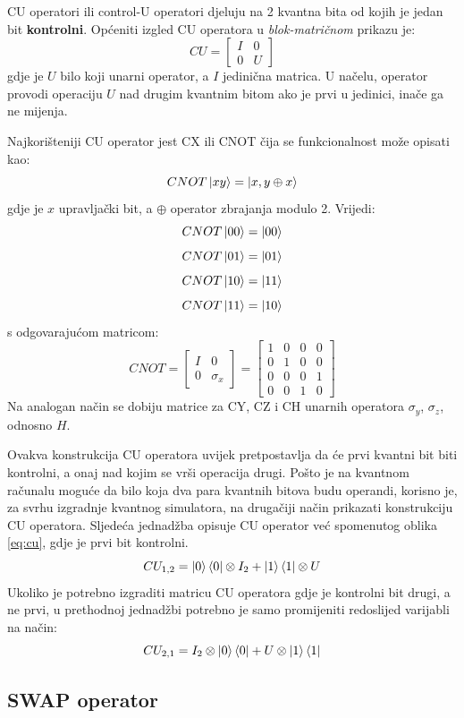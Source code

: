 CU operatori ili control-U operatori djeluju na 2 kvantna bita od kojih je jedan bit \textbf{kontrolni}. Općeniti izgled CU operatora u \emph{blok-matričnom} prikazu je:
\begin{equation}
CU = \begin{bmatrix}
I & 0 \\ 0 & U
\end{bmatrix}
\label{eq:cu}
\end{equation}
gdje je $U$ bilo koji unarni operator, a $I$ jedinična matrica. U načelu, operator provodi operaciju $U$ nad drugim kvantnim bitom ako je prvi u jedinici, inače ga ne mijenja.

Najkorišteniji CU operator jest CX ili CNOT čija se funkcionalnost može opisati kao:
\[
CNOT\ket{xy} = \ket{x, y\oplus x}
\]
gdje je $x$ upravljački bit, a $\oplus$ operator zbrajanja modulo 2. Vrijedi:
\[CNOT\ket{00} = \ket{00}\]
\[CNOT\ket{01} = \ket{01}\]
\[CNOT\ket{10} = \ket{11}\]
\[CNOT\ket{11} = \ket{10}\]
s odgovarajućom matricom:
\[
CNOT = \begin{bmatrix}
I & 0 \\ 0 & \sigma_x
\end{bmatrix} =
\begin{bmatrix}
1 & 0 & 0 & 0 \\ 0 & 1 & 0 & 0 \\ 0 & 0 & 0 & 1 \\ 0 & 0 & 1 & 0
\end{bmatrix}
\]
Na analogan način se dobiju matrice za CY, CZ i CH unarnih operatora $\sigma_y$, $\sigma_z$, odnosno $H$.

Ovakva konstrukcija CU operatora uvijek pretpostavlja da će prvi kvantni bit biti kontrolni, a onaj nad kojim se vrši operacija drugi. Pošto je na kvantnom računalu moguće da bilo koja dva para kvantnih bitova budu operandi, korisno je, za svrhu izgradnje kvantnog simulatora, na drugačiji način prikazati konstrukciju CU operatora. Sljedeća jednadžba opisuje CU operator već spomenutog oblika \ref{eq:cu}, gdje je prvi bit kontrolni.
\[
CU_{1,2} = \ket{0}\bra{0} \otimes I_2 + \ket{1}\bra{1} \otimes U
\]
Ukoliko je potrebno izgraditi matricu CU operatora gdje je kontrolni bit drugi, a ne prvi, u prethodnoj jednadžbi potrebno je samo promijeniti redoslijed varijabli na način:
\[
CU_{2,1} = I_2  \otimes \ket{0}\bra{0} + U \otimes \ket{1}\bra{1}
\]

\subsection{SWAP operator}

